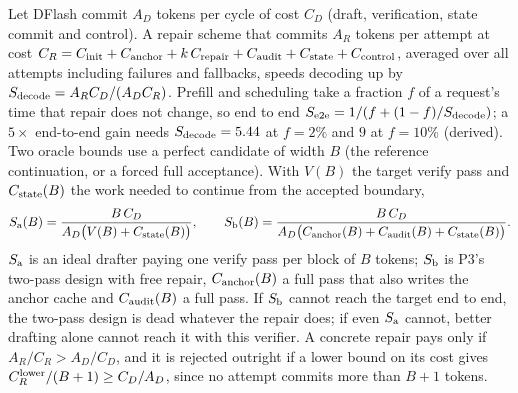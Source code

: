 Let DFlash commit $A_D$ tokens per cycle of cost $C_D$ (draft, verification, state commit and control). A repair scheme that commits $A_R$ tokens per attempt at cost $C_R=C_{\rm init}+C_{\rm anchor}+k\,C_{\rm repair}+C_{\rm audit}+C_{\rm state}+C_{\rm control}$, averaged over all attempts including failures and fallbacks, speeds decoding up by $S_{\rm decode}=A_RC_D/(A_DC_R)$. Prefill and scheduling take a fraction $f$ of a request's time that repair does not change, so end to end $S_{\rm e2e}=1/(f+(1-f)/S_{\rm decode})$; a $5\times$ end-to-end gain needs $S_{\rm decode}=5.44$ at $f=2\%$ and $9$ at $f=10\%$ (derived). Two oracle bounds use a perfect candidate of width $B$ (the reference continuation, or a forced full acceptance). With $V(B)$ the target verify pass and $C_{\rm state}(B)$ the work needed to continue from the accepted boundary,
\begin{equation}\label{eq:repair-oracle}
S_{\rm a}(B)=\frac{B\,C_D}{A_D\bigl(V(B)+C_{\rm state}(B)\bigr)},\qquad
S_{\rm b}(B)=\frac{B\,C_D}{A_D\bigl(C_{\rm anchor}(B)+C_{\rm audit}(B)+C_{\rm state}(B)\bigr)}.
\end{equation}
$S_{\rm a}$ is an ideal drafter paying one verify pass per block of $B$ tokens; $S_{\rm b}$ is P3's two-pass design with free repair, $C_{\rm anchor}(B)$ a full pass that also writes the anchor cache and $C_{\rm audit}(B)$ a full pass. If $S_{\rm b}$ cannot reach the target end to end, the two-pass design is dead whatever the repair does; if even $S_{\rm a}$ cannot, better drafting alone cannot reach it with this verifier. A concrete repair pays only if $A_R/C_R>A_D/C_D$, and it is rejected outright if a lower bound on its cost gives $C_R^{\rm lower}/(B+1)\ge C_D/A_D$, since no attempt commits more than $B+1$ tokens.

